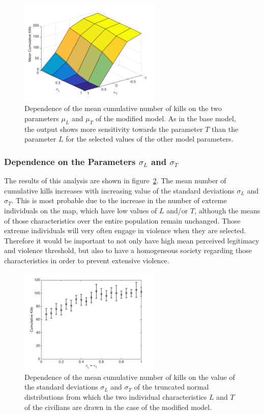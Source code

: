 \documentclass[11pt]{article}
\begin{document}
\begin{figure}[!htbp]
	\centering
		\includegraphics[width=0.6\textwidth]{../../code/modified_model/L_T_mean_dep_mean.png}
	\caption{Dependence of the mean cumulative number of kills on the two parameters $\mu_L$ and $\mu_T$ of the modified model. As in the base model, the output shows more sensitivity towards the parameter $T$ than the parameter $L$ for the selected values of the other model parameters.}
	\label{fig:L_T_dep_mod}
\end{figure}

\subsubsection{Dependence on the Parameters $\sigma_L$ and $\sigma_T$}
The results of this analysis are shown in figure~\ref{fig:L_T_std_dep}. The mean number of cumulative kills increases with increasing value of the standard deviations $\sigma_L$ and $\sigma_T$. This is most probable due to the increase in the number of extreme individuals on the map, which have low values of $L$ and/or $T$, although the means of those characteristics over the entire population remain unchanged. Those extreme individuals will very often engage in violence when they are selected. Therefore it would be important to not only have high mean perceived legitimacy and violence threshold, but also to have a homogeneous society regarding those characteristics in order to prevent extensive violence.
\begin{figure}[!htbp]
	\centering
		\includegraphics[width=0.6\textwidth]{../../code/modified_model/L_T_std_dep.png}
	\caption{Dependence of the mean cumulative number of kills on the value of the standard deviations $\sigma_L$ and $\sigma_T$ of the truncated normal distributions from which the two individual characteristics $L$ and $T$ of the civilians are drawn in the case of the modified model.}
	\label{fig:L_T_std_dep}
\end{figure}
\end{document}

